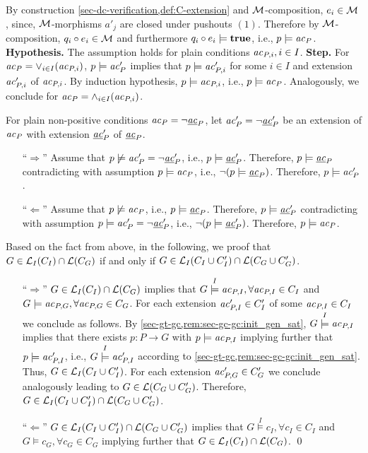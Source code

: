 \begin{enumerate}
By construction \cref{sec-dc-verification,def:C-extension} and ${\cal M}$-composition, $e_i \in {\cal M}$, since, ${\cal M}$-morphisms $a'_j$ are closed under pushouts $(1)$.
Therefore by ${\cal M}$-composition, $q_i \circ e_i \in {\cal M}$ and furthermore $q_i \circ e_i \models \textbf{true}$, i.e., $p \models \mathit{ac}_P$.
\textbf{Hypothesis.} The assumption holds for plain conditions $\mathit{ac}_{P,i},i \in I$.
\textbf{Step.} For $\mathit{ac}_P=\vee_{i \in I}(\mathit{ac}_{P,i})$, $p \models \mathit{ac}'_P$ implies that $p \models \mathit{ac}'_{P,i}$ for some $i \in I$ and extension $\mathit{ac}'_{P,i}$ of $\mathit{ac}_{P,i}$.
By induction hypothesis, $p \models \mathit{ac}_{P,i}$, i.e., $p \models \mathit{ac}_P$.
Analogously, we conclude for $\mathit{ac}_P=\wedge_{i \in I}(\mathit{ac}_{P,i})$.
\end{enumerate}

For plain non-positive conditions $\mathit{ac}_P=\neg\underline{\mathit{ac}}_P$, let $\mathit{ac}'_P=\neg\underline{\mathit{ac}}'_P$ be an extension of $\mathit{ac}_P$ with extension $\underline{\mathit{ac}}'_P$ of $\underline{\mathit{ac}}_P$.

\begin{enumerate}
  \item [``$\Rightarrow$''] Assume that $p \not\models \mathit{ac}'_P=\neg\underline{\mathit{ac}}'_P$, i.e., $p \models \underline{\mathit{ac}}'_P$.
  Therefore, $p \models \underline{\mathit{ac}}_P$ contradicting with assumption $p \models \mathit{ac}_P$, i.e., $\neg(p \models \underline{\mathit{ac}}_P)$.
  Therefore, $p \models \mathit{ac}'_P$.
  \item [``$\Leftarrow$''] Assume that $p \not\models \mathit{ac}_P$, i.e., $p \models \underline{\mathit{ac}}_P$.
  Therefore, $p \models \underline{\mathit{ac}}'_P$ contradicting with assumption $p \models \mathit{ac}'_P=\neg\underline{\mathit{ac}}'_P$, i.e., $\neg(p \models \underline{\mathit{ac}}'_P)$.
  Therefore, $p \models \mathit{ac}_P$.
\end{enumerate}

Based on the fact from above, in the following, we proof that $G \in \mathcal{L}_I(C_I) \cap \mathcal{L}(C_G)$ if and only if $G \in \mathcal{L}_I(C_I \cup C'_I) \cap \mathcal{L}(C_G \cup C'_G)$.

\begin{enumerate}
  \item [``$\Rightarrow$''] $G \in \mathcal{L}_I(C_I) \cap \mathcal{L}(C_G)$ implies that $G \stackrel{I}{\models} \mathit{ac}_{P,I},\forall \mathit{ac}_{P,I} \in C_I$ and $G \models \mathit{ac}_{P,G},\forall \mathit{ac}_{P,G} \in C_G$.
  For each extension $\mathit{ac}'_{P,I} \in C'_I$ of some $\mathit{ac}_{P,I} \in C_I$ we conclude as follows.
  By \cref{sec-gt-gc,rem:sec-gc-gc:init_gen_sat}, $G \stackrel{I}{\models} \mathit{ac}_{P,I}$ implies that there exists $p\colon P \to G$ with $p \models \mathit{ac}_{P,I}$ implying further that $p \models \mathit{ac}'_{P,I}$, i.e., $G \stackrel{I}{\models} \mathit{ac}'_{P,I}$ according to \cref{sec-gt-gc,rem:sec-gc-gc:init_gen_sat}.
  Thus, $G \in \mathcal{L}_I(C_I \cup C'_I)$.
  For each extension $\mathit{ac}'_{P,G} \in C'_G$ we conclude analogously leading to $G \in \mathcal{L}(C_G \cup C'_G)$.
  Therefore, $G \in \mathcal{L}_I(C_I \cup C'_I) \cap \mathcal{L}(C_G \cup C'_G)$.
  \item [``$\Leftarrow$''] $G \in \mathcal{L}_I(C_I \cup C'_I) \cap \mathcal{L}(C_G \cup C'_G)$ implies that $G \stackrel{I}{\models} c_I,\forall c_I \in C_I$ and $G \models c_G,\forall c_G \in C_G$ implying further that $G \in \mathcal{L}_I(C_I) \cap \mathcal{L}(C_G)$.\thispagestyle{plain}
  \qed
\end{enumerate}